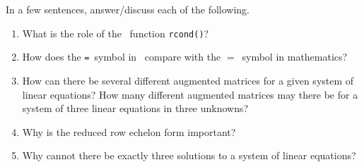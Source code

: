 \begin{exercise}  
In a few sentences, answer\slash discuss each of the following.
\begin{enumerate}
\item What is the role of the \script\ function \verb|rcond()|?

\item How does the \verb|=|~symbol in \script\ compare with the \(=\)~symbol in mathematics?

\item How can there be several different augmented matrices for a given system of linear equations?  How many different augmented matrices may there be for a system of three linear equations in three unknowns?

\item Why is the reduced row echelon form important?

\item Why cannot there be exactly three solutions to a system of linear equations?

\end{enumerate}
\end{exercise}


